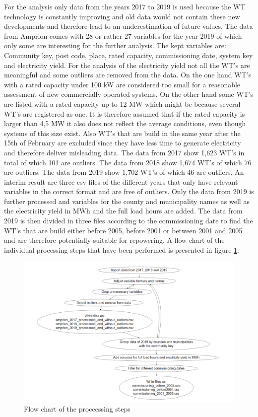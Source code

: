 \documentclass[a4paper,11pt]{article}
\begin{document}
For the analysis only data from the years 2017 to 2019 is used because the WT technology is constantly improving and old data would not contain these new developments and therefore lead to an underestimation of future values. The data from Amprion comes with 28 or rather 27 variables for the year 2019 of which only some are interesting for the further analysis. The kept variables are: Community key, post code, place, rated capacity, commissioning date, system key and electricity yield. For the analysis of the electricity yield not all the WT's are meaningful and some outliers are removed from the data. On the one hand WT's with a rated capacity under 100 kW are considered too small for a reasonable assessment of new commercially operated systems. On the other hand some WT's are listed with a rated capacity up to 12 MW which might be because several WT's are registered as one. It is therefore assumed that if the rated capacity is larger than 4,5 MW it also does not reflect the average conditions, even though systems of this size exist. Also WT's that are build in the same year after the 15th of February are excluded since they have less time to generate electricity and therefore deliver misleading data. The data from 2017 show 1,623 WT's in total of which 101 are outliers. The data from 2018 show 1,674 WT's of which 76 are outliers. The data from 2019 show 1,702 WT's of which 46 are outliers. An interim result are three csv files of the different years that only have relevant variables in the correct format and are free of outliers. Only the data from 2019 is further processed and variables for the county and municipality names as well as the electricity yield in MWh and the full load hours are added. The data from 2019 is then divided in three files according to the commissioning date to find the WT's that are build either before 2005, before 2001 or between 2001 and 2005 and are therefore potentially suitable for repowering. A flow chart of the individual processing steps that have been performed is presented in figure \ref{fig:preparation}.
\begin{figure}

{\centering \includegraphics[width=1\linewidth]{data/Amprion/results_of_preparation/flow} 

}

\caption{Flow chart of the proccessing steps}\label{fig:preparation}
\end{figure}
\end{document}
